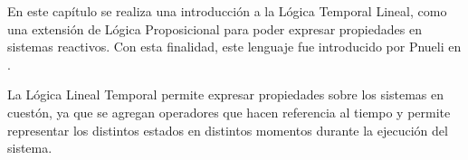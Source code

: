 En este capítulo se realiza una introducción a la Lógica Temporal Lineal, como una extensión de Lógica 
 Proposicional para poder expresar propiedades en sistemas reactivos.
Con esta finalidad, este lenguaje fue introducido por Pnueli en \cite{pnueli}.

La Lógica Lineal Temporal permite expresar propiedades sobre los sistemas en cuestón,
 ya que se agregan operadores que hacen referencia al tiempo y permite representar los distintos estados
 en distintos momentos durante la ejecución del sistema.

